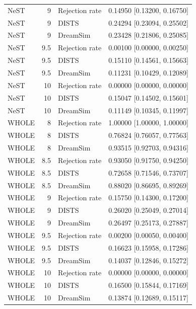 \documentclass[10pt,letterpaper]{article}
\begin{document}
\begin{longtable}{@{}lrll@{}}
NeST & 9 & Rejection rate & 0.14950 [0.13200, 0.16750]\\
NeST & 9 & DISTS & 0.24294 [0.23094, 0.25502]\\
NeST & 9 & DreamSim & 0.23428 [0.21806, 0.25085]\\
NeST & 9.5 & Rejection rate & 0.00100 [0.00000, 0.00250]\\
NeST & 9.5 & DISTS & 0.15110 [0.14561, 0.15663]\\
NeST & 9.5 & DreamSim & 0.11231 [0.10429, 0.12089]\\
NeST & 10 & Rejection rate & 0.00000 [0.00000, 0.00000]\\
NeST & 10 & DISTS & 0.15047 [0.14502, 0.15601]\\
NeST & 10 & DreamSim & 0.11149 [0.10345, 0.11997]\\
WHOLE & 8 & Rejection rate & 1.00000 [1.00000, 1.00000]\\
WHOLE & 8 & DISTS & 0.76824 [0.76057, 0.77563]\\
WHOLE & 8 & DreamSim & 0.93515 [0.92703, 0.94316]\\
WHOLE & 8.5 & Rejection rate & 0.93050 [0.91750, 0.94250]\\
WHOLE & 8.5 & DISTS & 0.72658 [0.71546, 0.73707]\\
WHOLE & 8.5 & DreamSim & 0.88020 [0.86695, 0.89269]\\
WHOLE & 9 & Rejection rate & 0.15750 [0.14300, 0.17200]\\
WHOLE & 9 & DISTS & 0.26020 [0.25049, 0.27014]\\
WHOLE & 9 & DreamSim & 0.26497 [0.25173, 0.27887]\\
WHOLE & 9.5 & Rejection rate & 0.00200 [0.00050, 0.00400]\\
WHOLE & 9.5 & DISTS & 0.16623 [0.15958, 0.17286]\\
WHOLE & 9.5 & DreamSim & 0.14037 [0.12846, 0.15272]\\
WHOLE & 10 & Rejection rate & 0.00000 [0.00000, 0.00000]\\
WHOLE & 10 & DISTS & 0.16500 [0.15844, 0.17169]\\
WHOLE & 10 & DreamSim & 0.13874 [0.12689, 0.15117]\\
\bottomrule\end{longtable}
\end{document}
